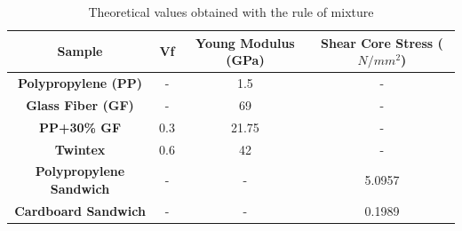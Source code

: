 \begin{table}[h]
\begin{tabular}{cccc}
\hline
\textbf{Sample}                 & \textbf{Vf} & \textbf{Young Modulus (GPa)} & \textbf{Shear Core Stress ($N/mm^2$)} \\ \hline
\textbf{Polypropylene (PP)}     & -             & 1.5                          & -                            	\\ \hline
\textbf{Glass Fiber (GF)}       & -             & 69                           & -                            	\\ \hline
\textbf{PP+30\% GF}            & 0.3           & 21.75                        & -                             	\\ \hline
\textbf{Twintex}                & 0.6           & 42                           & -                            	\\ \hline
\textbf{Polypropylene Sandwich} & -             & -                            & 5.0957                       	\\ \hline
\textbf{Cardboard Sandwich}     & -             & -                            & 0.1989				\\ \hline
\end{tabular}
\caption{Theoretical values obtained with the rule of mixture}
\label{tab:theoretical}
\end{table}

